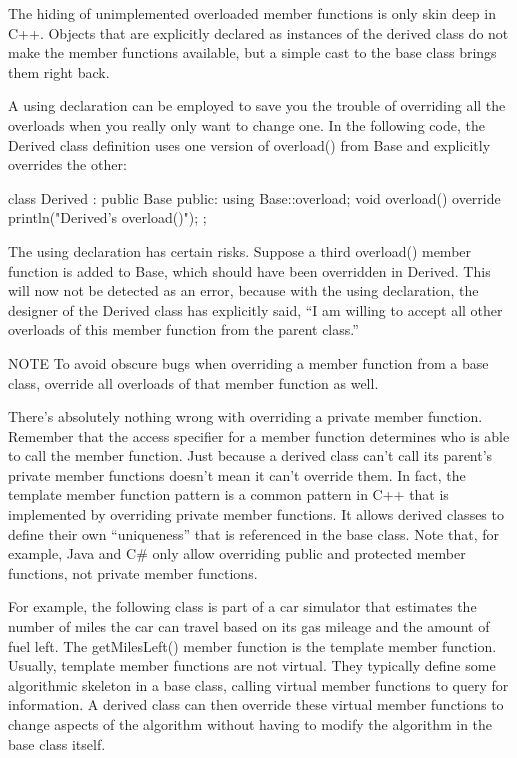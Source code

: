 The hiding of unimplemented overloaded member functions is only skin deep in C++. Objects that are explicitly declared as instances of the derived class do not make the member functions available, but a simple cast to the base class brings them right back.

A using declaration can be employed to save you the trouble of overriding all the overloads when you really only want to change one. In the following code, the Derived class definition uses one version of overload() from Base and explicitly overrides the other:

\begin{cpp}
class Derived : public Base
{
    public:
        using Base::overload;
        void overload() override { println("Derived's overload()"); }
};
\end{cpp}

The using declaration has certain risks. Suppose a third overload() member function is added to Base, which should have been overridden in Derived. This will now not be detected as an error, because with the using declaration, the designer of the Derived class has explicitly said, “I am willing to accept all other overloads of this member function from the parent class.”

\begin{myNotic}{NOTE}
To avoid obscure bugs when overriding a member function from a base class, override all overloads of that member function as well.
\end{myNotic}


There’s absolutely nothing wrong with overriding a private member function. Remember that the access specifier for a member function determines who is able to call the member function. Just because a derived class can’t call its parent’s private member functions doesn’t mean it can’t override them. In fact, the template member function pattern is a common pattern in C++ that is implemented by overriding private member functions. It allows derived classes to define their own “uniqueness” that is referenced in the base class. Note that, for example, Java and C\# only allow overriding public and protected member functions, not private member functions.

For example, the following class is part of a car simulator that estimates the number of miles the car can travel based on its gas mileage and the amount of fuel left. The getMilesLeft() member function is the template member function. Usually, template member functions are not virtual. They typically define some algorithmic skeleton in a base class, calling virtual member functions to query for information. A derived class can then override these virtual member functions to change aspects of the algorithm without having to modify the algorithm in the base class itself.

